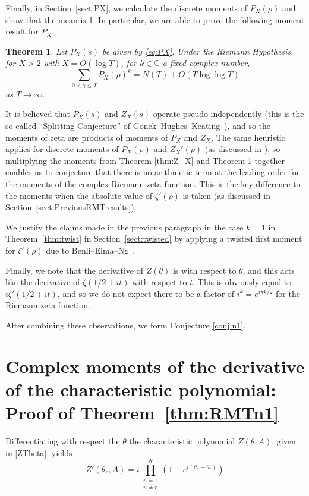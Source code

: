 \documentclass[12pt,a4paper,reqno]{amsart}
\newtheorem{theorem}{Theorem}
\theoremstyle{remark}
\numberwithin{equation}{section}
\newcommand{\CC}{\mathbb{C}}
\begin{document}
Finally, in Section~\ref{sect:PX}, we calculate the discrete moments of $P_X(\rho)$ and show that the mean is 1. In particular, we are able to prove the following moment result for $P_X$.
\begin{theorem}\label{thm:PXComplex}
Let $P_X(s)$ be given by \eqref{eq:PX}. Under the Riemann Hypothesis, for $X>2$ with $X=O(\log T)$, for $k\in\CC$ a fixed complex number,
\[
\sum_{0 < \gamma \leq T} P_X(\rho)^k = N(T) + O(T\log\log T)
\]
as $T\to\infty$.
\end{theorem}

It is believed that $P_X(s)$ and $Z_X(s)$ operate pseudo-independently (this is the so-called ``Splitting Conjecture'' of Gonek--Hughes--Keating~\cite{GHK07}), and so the moments of zeta are products of moments of $P_X$ and $Z_X$. The same heuristic applies for discrete moments of $P_X(\rho)$ and $Z_X'(\rho)$ (as discussed in \cite{BGM13}), so multiplying the moments from Theorem \ref{thm:Z_X} and Theorem \ref{thm:PXComplex} together enables us to conjecture that there is no arithmetic term at the leading order for the moments of the complex Riemann zeta function. This is the key difference to the moments when the absolute value of $\zeta'(\rho)$ is taken (as discussed in Section~\ref{sect:PreviousRMTresults}). 

We justify the claims made in the previous paragraph in the case $k=1$ in Theorem~\ref{thm:twist} in Section~\ref{sect:twisted} by applying a twisted first moment for $\zeta'(\rho)$ due to Benli--Elma--Ng~\cite{BEN23}.

Finally, we note that the derivative of $Z(\theta)$ is with respect to $\theta$, and this acts like the derivative of $\zeta(1/2+i t)$ with respect to $t$. This is obviously equal to $i \zeta'(1/2+i t)$, and so we do not expect there to be a factor of $i^k = e^{i \pi k / 2}$ for the Riemann zeta function.

After combining these observations, we form Conjecture \ref{conj:n1}.


\section{Complex moments of the derivative of the characteristic polynomial: Proof of Theorem~\ref{thm:RMTn1}}\label{sect:Selberg}

Differentiating with respect the $\theta$ the characteristic polynomial $Z(\theta,A)$, given in \eqref{ZTheta},  yields
\[
Z'(\theta_r,A) = i \prod_{\substack{n=1 \\ n \neq r}}^{N} \left(1-e^{i(\theta_n - \theta_r)}\right)
\]
\end{document}
